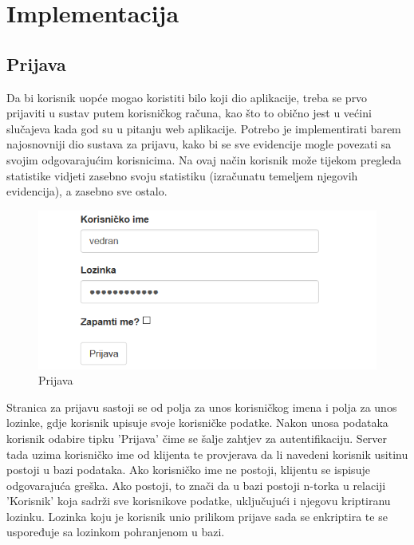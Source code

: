 \documentclass[times, utf8, zavrsni, numeric]{fer}
\begin{document}
\section{Implementacija}
\subsection{Prijava}
Da bi korisnik uopće mogao koristiti bilo koji dio aplikacije, treba se prvo prijaviti u sustav putem korisničkog računa, kao što to obično jest u većini slučajeva kada god su u pitanju web aplikacije. Potrebo je implementirati barem najosnovniji dio sustava za prijavu, kako bi se sve evidencije mogle povezati sa svojim odgovarajućim korisnicima. Na ovaj način korisnik može tijekom pregleda statistike vidjeti zasebno svoju statistiku (izračunatu temeljem njegovih evidencija), a zasebno sve ostalo.

\begin{figure}[H]
\centering
\includegraphics[width=\textwidth,height=\textheight,keepaspectratio]{img/prijava.png}
\caption{Prijava}
\label{fig:prijava}
\end{figure}

Stranica za prijavu sastoji se od polja za unos korisničkog imena i polja za unos lozinke, gdje korisnik upisuje svoje korisničke podatke. Nakon unosa podataka korisnik odabire tipku 'Prijava' čime se šalje zahtjev za autentifikaciju. Server tada uzima korisničko ime od klijenta te provjerava da li navedeni korisnik usitinu postoji u bazi podataka. Ako korisničko ime ne postoji, klijentu se ispisuje odgovarajuća greška. Ako postoji, to znači da u bazi postoji n-torka u relaciji 'Korisnik' koja sadrži sve korisnikove podatke, uključujući i njegovu kriptiranu lozinku. Lozinka koju je korisnik unio prilikom prijave sada se enkriptira te se uspoređuje sa lozinkom pohranjenom u bazi.

\lstset{style=csharp}

\end{document}
